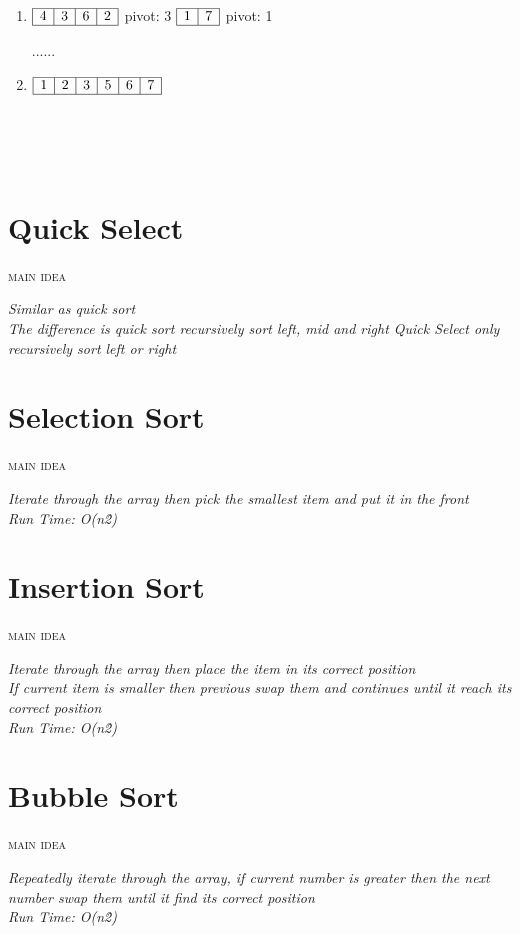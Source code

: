 \documentclass[12pt, letterpaper]{article}
\newcommand{\idea}[1]{
\noindent
\begin{minipage}[t]{0.15\textwidth}
	\textsc{main idea}
\end{minipage}
\hspace{-0.8cm}\vline\hspace{0.05cm}
\begin{minipage}[t]{0.88\textwidth}
	\textit{#1}
\end{minipage}\vspace{0.25cm}}
\begin{document}
\begin{minipage}{0.8\textwidth}
\begin{enumerate}
		\item
		$\begin{array}{|l|c|c|r|}
			\hline
			4 & 3 & 6 & 2\\
			\hline
		\end{array}$
		pivot: 3
		$\begin{array}{|l|r|}
			\hline
			1 & 7\\
			\hline
		\end{array}$
		pivot: 1
		
		......
		
		\item
		$\begin{array}{|l|c|c|c|c|r|}
			\hline
			1 & 2 & 3 & 5 & 6 & 7 \\
			\hline
		\end{array}$
	\end{enumerate}
\end{minipage}
\\\\\\

\section{Quick Select}
\idea{Similar as quick sort\\
	  The difference is quick sort recursively sort left, mid and right
	  Quick Select only recursively sort left or right}
	  
\newpage

\section{Selection Sort}
\idea{Iterate through the array then pick the smallest item and put it in
	  the front\\
	  Run Time: O(n\^{2})}
	  
\section{Insertion Sort}
\idea{Iterate through the array then place the item in its correct 
	  position\\ 
	  If current item is smaller then previous swap them and continues until it reach its correct position\\
	  Run Time: O(n\^{2})}
	  
\section{Bubble Sort}
\idea{Repeatedly iterate through the array, if current number is greater
	  then the next number swap them until it find its correct position\\
	  Run Time: O(n\^{2})}
	  
\end{document}
